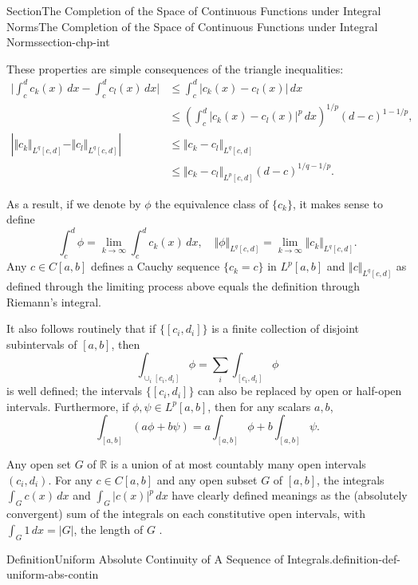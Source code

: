 \documentclass[oneside,10pt,]{article}
\numberwithin{equation}{section}
\newcommand{\bbR}{\mathbb{R}}
\newcommand{\amp}{&}
\begin{document}
\begin{sectionptx}{Section}{The Completion of the Space of Continuous Functions under Integral Norms}{}{The Completion of the Space of Continuous Functions under Integral Norms}{}{}{section-chp-int}
\par
These properties are simple consequences of the triangle inequalities:%
\begin{align*}
\vert \int_{c}^{d} c_{k}(x)\, dx - \int_{c}^{d} c_{l}(x)\, dx\vert \amp\le \int_{c}^{d} \vert c_{k}(x)-c_{l}(x)\vert \, dx\\
\amp\le \left(\int_{c}^{d} \vert c_{k}(x)-c_{l}(x)\vert^{p} \, dx\right)^{1/p}(d-c)^{1-1/p},\\
\left| \Vert c_{k} \Vert_{L^{q}[c,d]} -\Vert c_{l} \Vert_{L^{q}[c,d]}\right| \amp\le \Vert c_{k} -c_{l}\Vert_{L^{q}[c,d]}\\
\amp 	\le  \Vert c_{k} -c_{l}\Vert_{L^{p}[c,d]}(d-c)^{1/q-1/p}.
\end{align*}
%
\par
As a result, if we denote by \(\phi\) the equivalence class of \(\{ c_{k}\}\), it makes sense to define%
\begin{equation*}
\int_{c}^{d} \phi = \lim_{k\to\infty} \int_{c}^{d} c_{k}(x)\, dx, \quad
\Vert \phi \Vert_{L^{q}[c,d]}= \lim_{k\to\infty}\Vert c_{k} \Vert_{L^{q}[c,d]}.
\end{equation*}
Any \(c\in C[a, b]\) defines a Cauchy sequence \(\{c_{k} = c\}\) in \(L^{p}[a, b]\) and \(\Vert c \Vert_{L^{q}[c,d]}\) as defined through the limiting process above equals the definition through Riemann's integral.%
\par
It also follows routinely that if \(\{[c_{i}, d_{i}]\}\) is a finite collection of disjoint subintervals of \([a, b]\), then%
\begin{equation*}
\int_{\cup_{i} [c_{i}, d_{i}] }\phi = \sum_{i}\int_{[c_{i},d_{i}]} \phi 
\end{equation*}
is well defined; the intervals \(\{[c_{i}, d_{i}]\}\) can also be replaced by open or half-open intervals. Furthermore, if \(\phi, \psi \in L^{p}[a, b]\), then for any scalars \(a, b\),%
\begin{equation*}
\int_{[a, b]} (a \phi + b \psi ) = a \int_{[a, b]} \phi + b \int_{[a, b]} \psi.
\end{equation*}
%
\par
Any open set \(G\) of \(\bbR\) is a union of at most countably many open intervals \((c_{i}, d_{i})\). For any \(c\in C[a, b]\) and any open subset \(G\) of \([a, b]\), the integrals  \(\int_{G} c(x)\, dx\) and \(\int_{G} |c(x)|^{p}\, dx\) have  clearly defined meanings as the (absolutely convergent) sum of the integrals on each constitutive open intervals, with \(\int_{G} 1\, dx=|G|\), the length of \(G\) .%
\begin{definition}{Definition}{Uniform Absolute Continuity of A Sequence of Integrals.}{definition-def-uniform-abs-contin}%

\end{definition}
\end{sectionptx}
\end{document}

